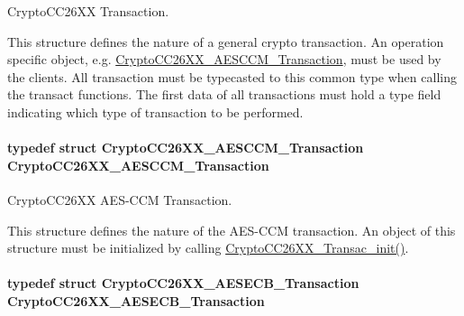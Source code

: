 Crypto\+C\+C26\+X\+X Transaction. 

This structure defines the nature of a general crypto transaction. An operation specific object, e.\+g. \hyperlink{struct_crypto_c_c26_x_x___a_e_s_c_c_m___transaction}{Crypto\+C\+C26\+X\+X\+\_\+\+A\+E\+S\+C\+C\+M\+\_\+\+Transaction}, must be used by the clients. All transaction must be typecasted to this common type when calling the transact functions. The first data of all transactions must hold a type field indicating which type of transaction to be performed. 
\paragraph[{Crypto\+C\+C26\+X\+X\+\_\+\+A\+E\+S\+C\+C\+M\+\_\+\+Transaction}]{\setlength{\rightskip}{0pt plus 5cm}typedef struct {\bf Crypto\+C\+C26\+X\+X\+\_\+\+A\+E\+S\+C\+C\+M\+\_\+\+Transaction}  {\bf Crypto\+C\+C26\+X\+X\+\_\+\+A\+E\+S\+C\+C\+M\+\_\+\+Transaction}}\label{_crypto_c_c26_x_x_8h_a9cf6019bce243720cebc70eb8310682e}


Crypto\+C\+C26\+X\+X A\+E\+S-\/\+C\+C\+M Transaction. 

This structure defines the nature of the A\+E\+S-\/\+C\+C\+M transaction. An object of this structure must be initialized by calling \hyperlink{_crypto_c_c26_x_x_8h_afb3ea8faceda234cdd62c5f53e203946}{Crypto\+C\+C26\+X\+X\+\_\+\+Transac\+\_\+init()}. 
\paragraph[{Crypto\+C\+C26\+X\+X\+\_\+\+A\+E\+S\+E\+C\+B\+\_\+\+Transaction}]{\setlength{\rightskip}{0pt plus 5cm}typedef struct {\bf Crypto\+C\+C26\+X\+X\+\_\+\+A\+E\+S\+E\+C\+B\+\_\+\+Transaction}  {\bf Crypto\+C\+C26\+X\+X\+\_\+\+A\+E\+S\+E\+C\+B\+\_\+\+Transaction}}\label{_crypto_c_c26_x_x_8h_a49f5f56e3a3f2f1aa354067e4261533f}


